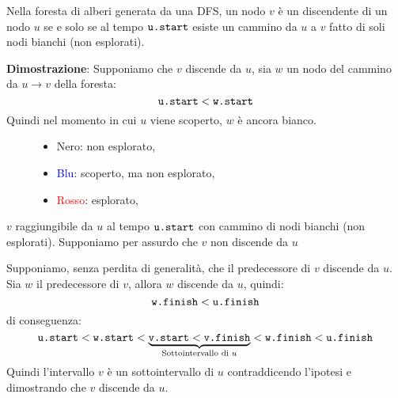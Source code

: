\documentclass[a4paper]{article}
\begin{document}
\begin{theorem}
  Nella foresta di alberi generata da una DFS, un nodo \( v \) è un discendente di un nodo
  \( u \) se e solo se al tempo \( \text{\texttt{u.start}} \) esiste un cammino da \( u \) 
  a \( v \) fatto di soli nodi bianchi (non esplorati).

  \vspace{1em}
  \noindent
  \textbf{Dimostrazione}: Supponiamo che \( v \) discende da \( u \), sia \( w \) un nodo
  del cammino da \( u \to v \) della foresta:
  \[
    \text{\texttt{u.start}} < \text{\texttt{w.start}}
  \] 
  Quindi nel momento in cui \( u \) viene scoperto, \( w \) è ancora bianco.
  \begin{figure}[H]
    \begin{itemize}
      \item Nero: non esplorato,
      \item \textcolor{blue}{Blu}: scoperto, ma non esplorato,
      \item \textcolor{red}{Rosso}: esplorato,
    \end{itemize}
    \centering
  \end{figure}

  \vspace{1em}
  \noindent
  \( v \) raggiungibile da \( u \) al tempo \( \text{\texttt{u.start}} \) con cammino
  di nodi bianchi (non esplorati). Supponiamo per assurdo che \( v \) non discende da \( u \) 
  \begin{figure}[H]
    \centering
  \end{figure}
  \noindent
  Supponiamo, senza perdita di generalità, che il predecessore di \( v \) discende da \( u \).
  Sia \( w \) il predecessore di \( v \), allora \( w \) discende da \( u \), quindi:
  \[
    \text{\texttt{w.finish}} < \text{\texttt{u.finish}}
  \] 
  di conseguenza:
  \[
    \text{\texttt{u.start}} < \text{\texttt{w.start}} < 
    \underbrace{\text{\texttt{v.start}} < \text{\texttt{v.finish}}}_{\text{Sottointervallo
    di \( u \)}}
    < \text{\texttt{w.finish}} < \text{\texttt{u.finish}}
  \] 
  Quindi l'intervallo \( v \) è un sottointervallo di \( u \) contraddicendo l'ipotesi
  e dimostrando che \( v \) discende da \( u \).
\end{theorem}
\end{document}
